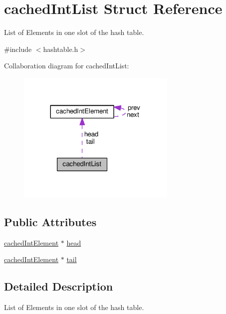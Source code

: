\hypertarget{structcachedIntList}{}\section{cached\+Int\+List Struct Reference}
\label{structcachedIntList}


List of Elements in one slot of the hash table.  




{\ttfamily \#include $<$hashtable.\+h$>$}



Collaboration diagram for cached\+Int\+List\+:\nopagebreak
\begin{figure}[H]
\begin{center}
\leavevmode
\includegraphics[width=215pt]{structcachedIntList__coll__graph}
\end{center}
\end{figure}
\subsection*{Public Attributes}
\begin{DoxyCompactItemize}
\item 
\hyperlink{structcachedIntElement}{cached\+Int\+Element} $\ast$ \hyperlink{structcachedIntList_ac4cce5e5d07c4b23683046e77a0fbe6a}{head}
\item 
\hyperlink{structcachedIntElement}{cached\+Int\+Element} $\ast$ \hyperlink{structcachedIntList_adbe1df126c4425546e3a2b4366784c9d}{tail}
\end{DoxyCompactItemize}


\subsection{Detailed Description}
List of Elements in one slot of the hash table. 

